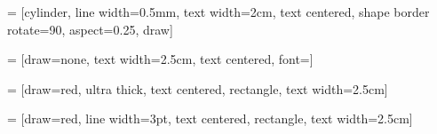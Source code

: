 




     = [cylinder, line width=0.5mm, text width=2cm, text centered, 
                      shape border rotate=90, aspect=0.25, draw]

 = [draw=none, text width=2.5cm, text centered, font=\fontsize{15}{0}\selectfont] 

   = [draw=red,         %
                     ultra thick,   %
                     text centered,
                     rectangle,        %
                     text width=2.5cm] %

   = [draw=red,         %
                     line width=3pt,   %
                     text centered,
                     rectangle,        %
                     text width=2.5cm] %
                     
